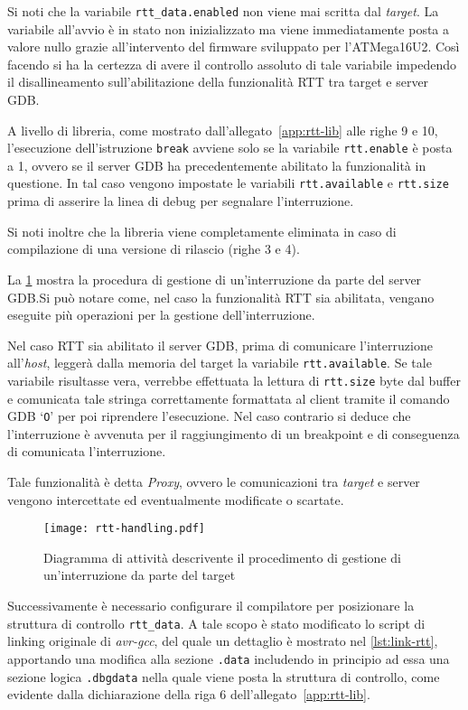 Si noti che la variabile \texttt{rtt\_data.enabled} non viene mai scritta dal \textit{target}. La variabile all'avvio è in stato non inizializzato ma viene immediatamente posta a valore nullo grazie all'intervento del firmware sviluppato per l'ATMega16U2. Così facendo si ha la certezza di avere il controllo assoluto di tale variabile impedendo il disallineamento sull'abilitazione della funzionalità RTT tra target e server GDB.\@

A livello di libreria, come mostrato dall'allegato~\ref{app:rtt-lib} alle righe 9 e 10, l'esecuzione dell'istruzione \texttt{break} avviene solo se la variabile \texttt{rtt.enable} è posta a 1, ovvero se il server GDB ha precedentemente abilitato la funzionalità in questione. In tal caso vengono impostate le variabili \texttt{rtt.available} e \texttt{rtt.size} prima di asserire la linea di debug per segnalare l'interruzione.

Si noti inoltre che la libreria viene completamente eliminata in caso di compilazione di una versione di rilascio (righe 3 e 4).

La \cref{fig:rtt-gdbsrv} mostra la procedura di gestione di un'interruzione da parte del server GDB.\@ Si può notare come, nel caso la funzionalità RTT sia abilitata, vengano eseguite più operazioni per la gestione dell'interruzione.

Nel caso RTT sia abilitato il server GDB, prima di comunicare l'interruzione all'\textit{host}, leggerà dalla memoria del target la variabile \texttt{rtt.available}. Se tale variabile risultasse vera, verrebbe effettuata la lettura di \texttt{rtt.size} byte dal buffer e comunicata tale stringa correttamente formattata al client tramite il comando GDB `\texttt{O}'\cite{site:gdbproto} per poi riprendere l'esecuzione. Nel caso contrario si deduce che l'interruzione è avvenuta per il raggiungimento di un breakpoint e di conseguenza di comunicata l'interruzione.

Tale funzionalità è detta \textit{Proxy}, ovvero le comunicazioni tra \textit{target} e server vengono intercettate ed eventualmente modificate o scartate.

\begin{figure}[b]
    \centering
    \texttt{[image: rtt-handling.pdf]}
    \caption[]{Diagramma di attività descrivente il procedimento di gestione di un'interruzione da parte del target}\label{fig:rtt-gdbsrv}
\end{figure}

Successivamente è necessario configurare il compilatore per posizionare la struttura di controllo \texttt{rtt\_data}. A tale scopo è stato modificato lo script di linking originale di \textit{avr-gcc}, del quale un dettaglio è mostrato nel \cref{lst:link-rtt}, apportando una modifica alla sezione \texttt{.data} includendo in principio ad essa una sezione logica \texttt{.dbgdata} nella quale viene posta la struttura di controllo, come evidente dalla dichiarazione della riga 6 dell'allegato~\ref{app:rtt-lib}.


